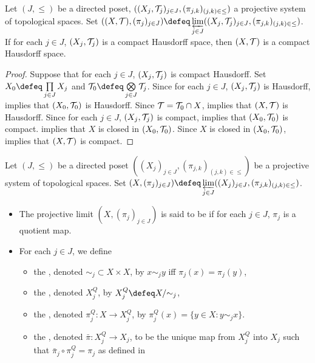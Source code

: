\documentclass{book}
\begin{document}
\begin{ex} 
	Let $(J, {\leq})$ be a directed poset, $((X_j, \mathcal{T}_j)_{j \in J}, (\pi_{j,k})_{(j,k) \in \leq})$ a projective system of topological spaces. Set $((X, \MT), (\pi_j)_{j \in J}) \defeq \varprojlim\limits_{j \in J} ((X_j, \MT_j)_{j \in J}, (\pi_{j,k})_{(j,k) \in \leq})$. If for each $j \in J$, $(X_j, \mathcal{T}_j)$ is a compact Hausdorff space, then $(X, \mathcal{T})$ is a compact Hausdorff space. 
\end{ex}

\begin{proof}
	Suppose that for each $j \in J$, $(X_j, \mathcal{T}_j)$ is compact Hausdorff. Set $X_0 \defeq \prod\limits_{j \in J} X_j$ and $\MT_0 \defeq \bigotimes\limits_{j \in J} \MT_j$. Since for each $j \in J$, $(X_j, \mathcal{T}_j)$ is Hausdorff,  implies that $(X_0, \mathcal{T}_0)$ is Hausdorff. Since $\mathcal{T} = \mathcal{T}_0 \cap X$,  implies that $(X, \mathcal{T})$ is Hausdorff. Since for each $j \in J$, $(X_j, \mathcal{T}_j)$ is compact,  implies that $(X_0, \mathcal{T}_0)$ is compact.  implies that $X$ is closed in $(X_0, \mathcal{T}_0)$. Since $X$ is closed in $(X_0, \mathcal{T}_0)$,  implies that $(X, \mathcal{T})$ is compact. 
\end{proof}

\begin{defn} 
	Let $(J, {\leq})$ be a directed poset $((X_j)_{j \in J}, (\pi_{j,k})_{(j,k) \in \leq})$ be a projective system of topological spaces. Set $(X, (\pi_j)_{j \in J}) \defeq \varprojlim\limits_{j \in J} ((X_j)_{j \in J}, (\pi_{j,k})_{(j,k) \in \leq})$. 
	\begin{itemize}
		\item The projective limit $(X, (\pi_j)_{j \in J})$ is said to be  if for each $j \in J$, $\pi_j$ is a quotient map.
		\item For each $j \in J$, we define
		\begin{itemize}
			\item the , denoted ${\sim_j} \subset X \times X$, by $x \sim_j y$ iff $\pi_j(x) = \pi_j(y)$, 
			\item the , denoted $X^Q_j$, by $X^Q_j \defeq X/{\sim_j}$,
			\item the , denoted $\pi^Q_j:X \rightarrow X^Q_j$, by $\pi^Q_j(x) = \{y \in X: y \sim_j x\}$.
			\item the , denoted $\bar{\pi}:X^Q_j \rightarrow X_j$, to be the unique map from $X^Q_j$ into $X_j$ such that $\bar{\pi}_j \circ \pi^Q_j = \pi_j$ as defined in 
		\end{itemize}
	\end{itemize}
\end{defn}
\end{document}
